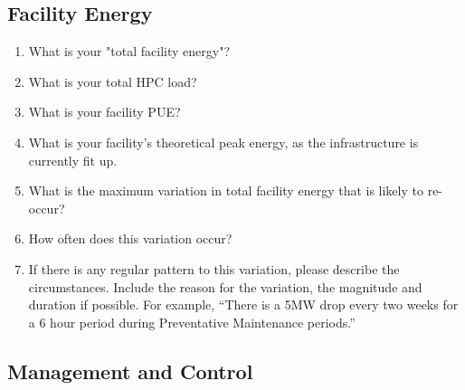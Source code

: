 \subsection{Facility Energy}
\begin{enumerate}  [nosep]
\item
What is your "total facility energy"?

\item
What is your total HPC load?

\item
What is your facility PUE?

\item
What is your facility's theoretical peak energy, as the infrastructure is currently fit up.

\item
What is the maximum variation in total facility energy that is likely to re-occur? 

\item
 How often does this variation occur?

\item
If there is any regular pattern to this variation, please describe the circumstances. 
Include the reason for the variation, the magnitude and duration if possible. 
For example, ``There is a 5MW drop every two weeks for a 6 hour period during Preventative 
Maintenance periods.''
\end{enumerate}

\subsection{Management and Control}


